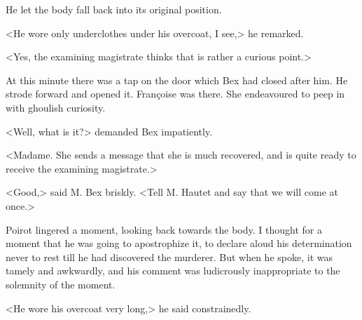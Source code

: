  He let the body fall back into its original position. 

 <He wore only underclothes under his overcoat, I see,> he remarked. 

 <Yes, the examining magistrate thinks that is rather a curious point.> 

 At this minute there was a tap on the door which Bex had closed after him. He strode forward and opened it. Françoise was there. She endeavoured to peep in with ghoulish curiosity. 

 <Well, what is it?> demanded Bex impatiently. 

 <Madame. She sends a message that she is much recovered, and is quite ready to receive the examining magistrate.> 

 <Good,> said M. Bex briskly. <Tell M. Hautet and say that we will come at once.> 

 Poirot lingered a moment, looking back towards the body. I thought for a moment that he was going to apostrophize it, to declare aloud his determination never to rest till he had discovered the murderer. But when he spoke, it was tamely and awkwardly, and his comment was ludicrously inappropriate to the solemnity of the moment. 

 <He wore his overcoat very long,> he said constrainedly.